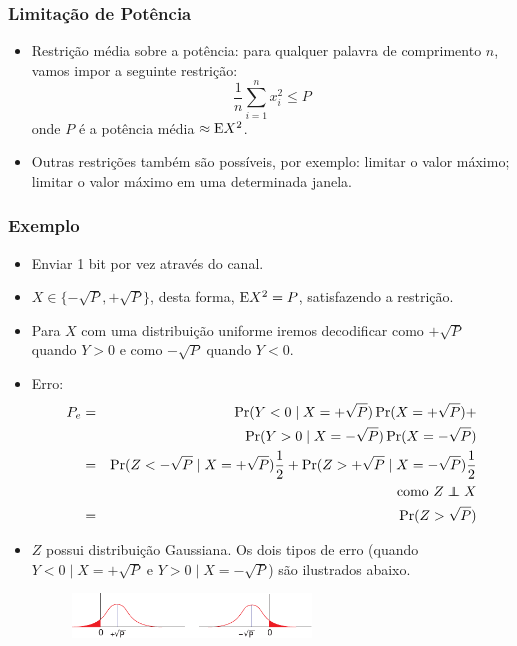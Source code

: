 \begin{frame}[allowframebreaks]
  \frametitle{Limitação de Potência}
  \begin{itemize}
  \item Restrição média sobre a potência: para qualquer palavra de comprimento $n$, 
	vamos impor a seguinte restrição:
	\begin{equation}
	\frac{1}{n} \sum_{i=1}^{n} x_i^2 \leq P
	\end{equation} 
	onde $P$ é a potência média $\approx \mathrm{E} X^2$.
  \item Outras restrições também são possíveis, por exemplo:
	limitar o valor máximo; limitar o valor máximo em uma determinada janela.
  \end{itemize}
\end{frame}

\begin{frame}[allowframebreaks]
  \frametitle{Exemplo}
  \begin{itemize}
  \item Enviar 1 bit por vez através do canal.
  \item $X \in \{ - \sqrt{P} , + \sqrt{P} \}$, desta forma, $\mathrm{E} X^2 = P$, satisfazendo a restrição.
  \item Para $X$ com uma distribuição uniforme iremos decodificar como $+ \sqrt{P}$ quando $Y>0$ e 
	como $- \sqrt{P}$ quando $Y < 0$.
  \item Erro:
	\begin{eqnarray}
	P_e &=& \Pr(Y < 0 \mid X = +\sqrt{P}) \Pr(X = +\sqrt{P}) + \nonumber \\
		&& \Pr(Y > 0 \mid X = -\sqrt{P}) \Pr(X = -\sqrt{P}) \\
	    &=& \Pr(Z < -\sqrt{P} \mid X = +\sqrt{P}) \frac{1}{2} + \Pr(Z > +\sqrt{P} \mid X = -\sqrt{P}) \frac{1}{2} \\
		&& \text{como } Z \independent X \nonumber \\
	    &=& \Pr(Z > \sqrt{P})
	\end{eqnarray}
  \item $Z$ possui distribuição Gaussiana. Os dois tipos de erro (quando $Y < 0 \mid X = +\sqrt{P}$ e $Y > 0 \mid X = -\sqrt{P}$) 
	são ilustrados abaixo.

  \begin{figure}[h!]
  \centering
  \includegraphics[width=0.6\textwidth]{images/gausschanexerror.pdf}
  \label{fig:gausschanexerror}
  \end{figure}



\end{itemize}
\end{frame}
